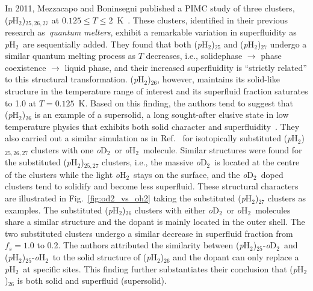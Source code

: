 \documentclass[12pt]{iopart}
\newcommand{\odtwo}{{\em o}D$_2$}
\newcommand{\phtwo}{{\em p}H$_2$}
\newcommand{\ohtwo}{{\em o}H$_2$}
\begin{document}
In 2011, Mezzacapo and Boninsegni published a PIMC study of three clusters, 
(\phtwo)$_{25,26,27}$ at $0.125 \le T \le 2$~K~\cite{mezzacapo_supersolid}. 
These clusters, identified  in their previous research as~{\em quantum melters}, 
exhibit a remarkable variation in superfluidity as \phtwo~are sequentially added. 
They found that both (\phtwo)$_{25}$ and (\phtwo)$_{27}$ undergo a similar quantum melting process as $T$ decreases, i.e., solidephase $\rightarrow$ phase coexistence $\rightarrow$ liquid phase, and their increased superfluidity is ``strictly related'' to this structural transformation. 
(\phtwo)$_{26}$, however, maintains its solid-like structure in the temperature range of interest and its superfluid fraction saturates to 1.0 at $T=0.125$~K. 
Based on this finding, the authors tend to suggest that (\phtwo)$_{26}$ is an example of a supersolid, a long sought-after elusive state in low temperature physics that exhibits both solid character and superfluidity~\cite{chester_supersolid,Leggett_supersolid,kim_chan_supersolid,kim_chan_supersolid_he,leggett_defy_supersolid,ceperley_defies_supersolid,rittner_he_supersolid,rittner_supersolid_he_2,graves_he_supersolid,kondo_supersolid,penzev_he_supersolid,chan_supersolidity_2008}. 
They also carried out a similar simulation as in Ref.~\cite{mezzacapo_isotope_h2} for isotopically substituted (\phtwo)$_{25,26,27}$ clusters with one \odtwo~or \ohtwo~molecule. 
Similar structures were found for the substituted (\phtwo)$_{25,27}$ clusters, i.e., the massive \odtwo~is located at the centre of the clusters while the light \ohtwo~stays on the surface, 
and the \odtwo~doped clusters tend to solidify and become less superfluid. 
These structural characters are illustrated in Fig.~\ref{fig:od2_vs_oh2} taking the substituted (\phtwo)$_{27}$ clusters as examples. 
The substituted (\phtwo)$_{26}$ clusters with either \odtwo~or \ohtwo~molecules share a similar structure and the dopant is mainly located in the outer shell. 
The two substituted clusters undergo a similar decrease in superfluid fraction from $f_s=1.0$ to 0.2. 
The authors attributed the similarity between (\phtwo)$_{25}$-\odtwo~and (\phtwo)$_{25}$-\ohtwo~to the solid structure of (\phtwo)$_{26}$ and the dopant can only replace a \phtwo~at specific sites. 
This finding further substantiates their conclusion that (\phtwo)$_{26}$ is both solid and superfluid (supersolid).
\end{document}
